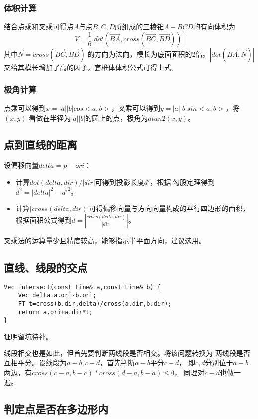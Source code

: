 \subsubsection{体积计算}
结合点乘和叉乘可得点$A$与点$B,C,D$所组成的三棱锥$A-BCD$的有向体积为
\begin{displaymath}
	V=\frac{1}{6}|dot(\overrightarrow{BA},cross(\overrightarrow{BC},
	\overrightarrow{BD}))|
\end{displaymath}
其中$\overrightarrow{N}=cross(\overrightarrow{BC},\overrightarrow{BD})$
的方向为法向，模长为底面面积的2倍。$|dot(\overrightarrow{BA},\overrightarrow{N})|$
又给其模长增加了高的因子。套椎体体积公式可得上式。
\subsubsection{极角计算}
点乘可以得到$x=|a||b|cos<a,b>$，叉乘可以得到$y=|a||b|sin<a,b>$，将$(x,y)$
看做在半径为$|a||b|$的圆上的点，极角为$atan2(x,y)$。
\subsection{点到直线的距离}
设偏移向量$delta=p-ori$：
\begin{itemize}
	\item 计算$dot(delta,dir)/|dir|$可得到投影长度$d'$，根据
	      勾股定理得到$d^2=|delta|^2-d'^2$。
	\item 计算$|cross(delta,dir)|$可得偏移向量与方向向量构成的平行四边形的面积，
	      根据面积公式得到$d=|\frac{cross(delta,dir)}{|dir|}|$。
\end{itemize}
叉乘法的运算量少且精度较高，能够指示半平面方向，建议选用。
\subsection{直线、线段的交点}
\begin{lstlisting}
Vec intersect(const Line& a,const Line& b) {
    Vec delta=a.ori-b.ori;
    FT t=cross(b.dir,delta)/cross(a.dir,b.dir);
    return a.ori+a.dir*t;
}
\end{lstlisting}
证明留坑待补。

线段相交也是如此，但首先要判断两线段是否相交。将该问题转换为
两线段是否互相平分。设线段为$a-b,c-d$，首先判断$a-b$平分$c-d$，
即$c,d$分别位于$a-b$两边，有$cross(c-a,b-a)*cross(d-a,b-a)\leq 0$，
同理对$c-d$也做一遍。
\subsection{判定点是否在多边形内}
